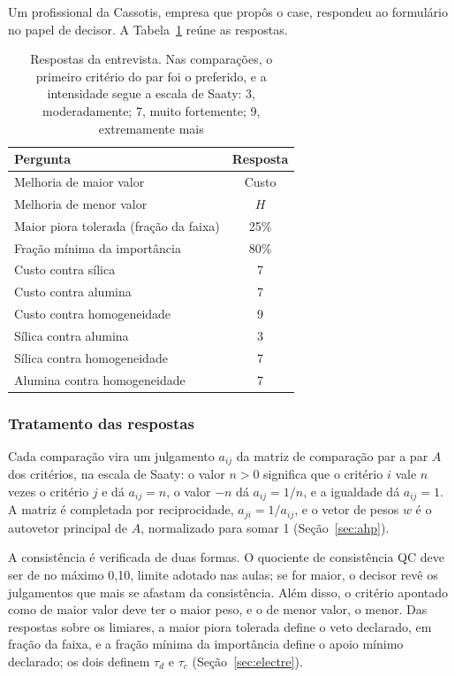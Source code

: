 \documentclass[conference]{IEEEtran}
\begin{document}
Um profissional da Cassotis, empresa que propôs o case, respondeu ao formulário no papel de decisor. A Tabela~\ref{tab:entrevista} reúne as respostas.

\begin{table}[htbp]
\caption{Respostas da entrevista. Nas comparações, o primeiro critério do par foi o preferido, e a intensidade segue a escala de Saaty: 3, moderadamente; 7, muito fortemente; 9, extremamente mais}
\centering
\small
\begin{tabular}{p{} c}
\toprule
\textbf{Pergunta} & \textbf{Resposta} \\
\midrule
Melhoria de maior valor & Custo \\
Melhoria de menor valor & $H$ \\
Maior piora tolerada (fração da faixa) & 25\% \\
Fração mínima da importância & 80\% \\
Custo contra sílica & 7 \\
Custo contra alumina & 7 \\
Custo contra homogeneidade & 9 \\
Sílica contra alumina & 3 \\
Sílica contra homogeneidade & 7 \\
Alumina contra homogeneidade & 7 \\
\bottomrule
\end{tabular}
\label{tab:entrevista}
\end{table}

\subsubsection{Tratamento das respostas}

Cada comparação vira um julgamento $a_{ij}$ da matriz de comparação par a par $A$ dos critérios, na escala de Saaty: o valor $n>0$ significa que o critério $i$ vale $n$ vezes o critério $j$ e dá $a_{ij}=n$, o valor $-n$ dá $a_{ij}=1/n$, e a igualdade dá $a_{ij}=1$. A matriz é completada por reciprocidade, $a_{ji}=1/a_{ij}$, e o vetor de pesos $w$ é o autovetor principal de $A$, normalizado para somar 1 (Seção~\ref{sec:ahp}).

A consistência é verificada de duas formas. O quociente de consistência QC deve ser de no máximo 0{,}10, limite adotado nas aulas; se for maior, o decisor revê os julgamentos que mais se afastam da consistência. Além disso, o critério apontado como de maior valor deve ter o maior peso, e o de menor valor, o menor. Das respostas sobre os limiares, a maior piora tolerada define o veto declarado, em fração da faixa, e a fração mínima da importância define o apoio mínimo declarado; os dois definem $\tau_d$ e $\tau_c$ (Seção~\ref{sec:electre}).
\end{document}
